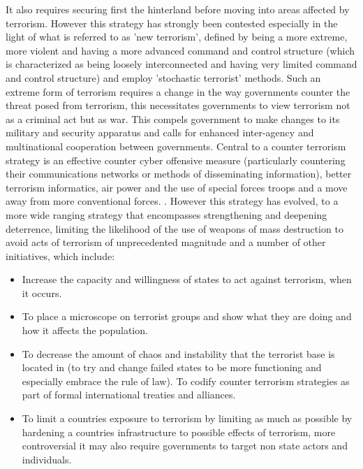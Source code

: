 It also requires securing first the hinterland before moving into areas affected by terrorism. However this strategy has strongly been contested especially in the light of what is referred to as 'new terrorism', defined by being a more extreme, more violent and having a more advanced command and control structure (which is characterized as being loosely interconnected and having very limited command and control structure) and employ 'stochastic terrorist' methods. Such an extreme form of terrorism requires a change in the way governments counter the threat posed from terrorism, this necessitates governments to view terrorism not as a criminal act but as war. This compels government to make changes to its military and security apparatus and calls for enhanced inter-agency and multinational cooperation between governments. Central to a counter terrorism strategy is an effective counter cyber offensive measure (particularly countering their communications networks or methods of disseminating information), better terrorism informatics, air power and the use of special forces troops and a move away from more conventional forces. \citep{lesser1999countering}. However this strategy has evolved, \citep{lesser1999countering} to a more wide ranging strategy that encompasses strengthening and deepening deterrence, limiting the likelihood of the use of weapons of mass destruction to avoid acts of terrorism of unprecedented magnitude and a number of other initiatives, which include: 
\begin{itemize}
\item Increase the capacity and willingness of states to act against terrorism, when it occurs. 
\item To place a microscope on terrorist groups and show what they are doing and how it affects the population. 
\item To decrease the amount of chaos and instability that the terrorist base is located in (to try and change failed states to be more functioning and especially embrace the rule of law). To codify counter terrorism strategies as part of formal international treaties and alliances. 
\item To limit a countries exposure to terrorism by limiting as much as possible by hardening a countries infrastructure to possible effects of terrorism, more controversial it may also require governments to target non state actors and individuals.
\end{itemize}

